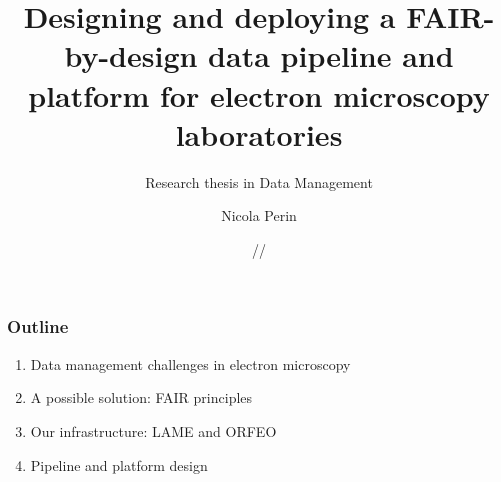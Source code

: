 \documentclass{beamer}
\title[FAIR-by-design EM pipeline]{Designing and deploying a FAIR-by-design data pipeline and platform for electron microscopy laboratories}
\subtitle{Research thesis in Data Management}
\institute{University of Trieste}
\author[Nicola Perin]{Nicola Perin}
\date{\the\day/\the\month/\the\year}
\begin{document}
	\begin{frame}
		\setTitlestyleDissertation
		\maketitle
	\end{frame}
	
	\begin{frame}
		\frametitle{Outline}
		\large
		\begin{enumerate}
			\item Data management challenges in electron microscopy
			\item A possible solution: FAIR principles
			\item Our infrastructure: LAME and ORFEO
			\item Pipeline and platform design
		\end{enumerate}
	\end{frame}
	
\end{document}
